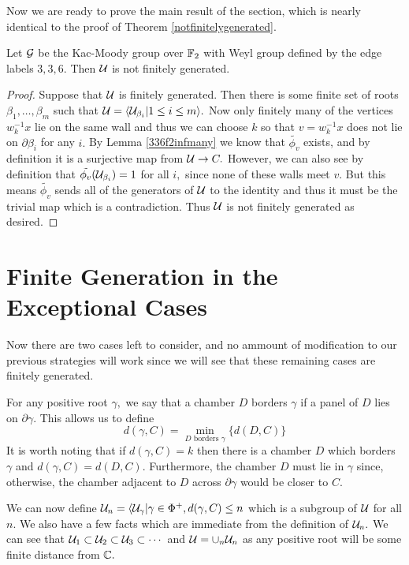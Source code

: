 \documentclass[class=book, crop=false]{standalone}
\begin{document}
Now we are ready to prove the main result of the section, which is nearly identical to the proof of Theorem \ref{notfinitelygenerated}.
\begin{theorem}
	\label{336f2notfg}
	Let $\mathcal{G}$ be the Kac-Moody group over $\mathbb{F}_{2}$ with Weyl group defined by the edge labels $3,3,6.$ Then $\mathcal{U}$ is not finitely generated.
\end{theorem}
\begin{proof}
	Suppose that $\mathcal{U}$ is finitely generated. Then there is some finite set of roots $\beta_1,\dots,\beta_m$ such that $\mathcal{U}=\langle \mathcal{U}_{\beta_i}|1\le i\le m\rangle.$ Now only finitely many of the vertices $w_k^{-1}x$ lie on the same wall and thus we can choose $k$ so that $v=w_k^{-1}x$ does not lie on $\partial \beta_i$ for any $i.$ By Lemma \ref{336f2infmany} we know that $\tilde{\phi_v}$ exists, and by definition it is a surjective map from $\mathcal{U}\to C.$ However, we can also see by definition that $\tilde{\phi_v}(\mathcal{U}_{\beta_i})=1$ for all $i,$ since none of these walls meet $v.$ But this means $\tilde{\phi_v}$ sends all of the generators of $\mathcal{U}$ to the identity and thus it must be the trivial map which is a contradiction. Thus $\mathcal{U}$ is not finitely generated as desired.
\end{proof}

\section{Finite Generation in the Exceptional Cases}
Now there are two cases left to consider, and no ammount of modification to our previous strategies will work since we will see that these remaining cases are finitely generated. 

For any positive root $\gamma,$ we say that a chamber $D$ borders $\gamma$ if a panel of $D$ lies on $\partial \gamma.$ This allows us to define
\[
	d(\gamma,C)=\min_{D\text{ borders }\gamma} \{d(D,C)\}
\]
It is worth noting that if $d(\gamma,C)=k$ then there is a chamber $D$ which borders $\gamma$ and $d(\gamma,C)=d(D,C).$ Furthermore, the chamber $D$ must lie in $\gamma$ since, otherwise, the chamber adjacent to $D$ across $\partial\gamma$ would be closer to $C.$

We can now define $\mathcal{U}_n=\langle \mathcal{U}_{\gamma}|\gamma\in \Phi^+, d(\gamma,C)\le n$ which is a subgroup of $\mathcal{U}$ for all $n.$ We also have a few facts which are immediate from the definition of $\mathcal{U}_n.$ We can see that $\mathcal{U}_1\subset \mathcal{U}_2\subset \mathcal{U}_3\subset \cdots$ and $\mathcal{U}=\cup_{n}\mathcal{U}_n$ as any positive root will be some finite distance from $\mathbb{C}.$ 
\end{document}
